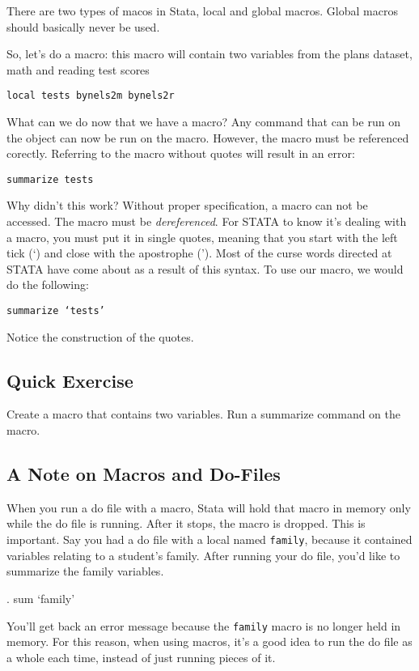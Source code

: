 \documentclass[10pt]{article}
\begin{document}
There are two types of macos in Stata, local and global macros. Global
macros should basically never be used. 

So, let's do a macro: this macro will contain two variables from the
plans dataset, math and reading test scores

\texttt{local tests bynels2m  bynels2r}

What can we do now that we have a macro? Any command that can be run
on the object can now be run on the macro. However, the macro must be
referenced corectly. Referring to the macro without quotes will
result in an error:

\texttt{summarize tests}

Why didn't this work? Without proper specification, a macro can not be
accessed. The macro must be \textit{dereferenced}. For STATA to know
it's dealing with a macro, you must put it in single quotes, meaning
that you start with the left tick (`) and close with the apostrophe (').
Most of the curse words directed at STATA have come about as a result
of this syntax. To use our macro, we would do the following:

\texttt{summarize `tests'}

Notice the construction of the quotes. 

\subsection{Quick Exercise}

Create a macro that contains two variables. Run a summarize command on
the macro.


\subsection{A Note on Macros and Do-Files}

When you run a do file with a macro, Stata will hold that macro in
memory only while the do file is running. After it stops, the macro is
dropped. This is important. Say you had a do file with a local named
\texttt{family}, because it contained variables relating to a
student's family. After running your do file, you'd like to summarize
the family variables. 

\begin{stlog}
  . sum `family'
\end{stlog}

You'll get back an error message because the \texttt{family} macro is
no longer held in memory. For this reason, when using macros, it's a
good idea to run the do file as a whole each time, instead of just
running pieces of it. 
\end{document}
